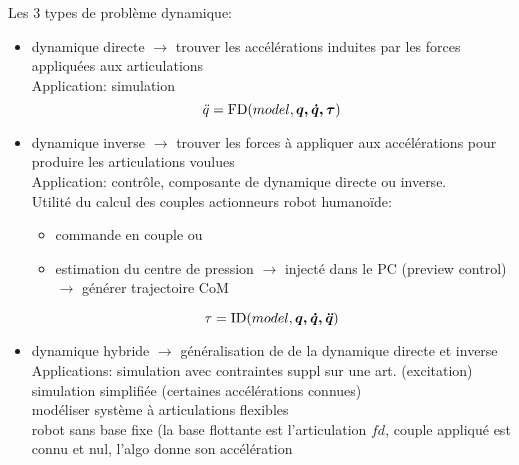 \documentclass[10pt]{beamer}
\begin{document}
\begin{frame}[allowframebreaks]
	Les 3 types de problème dynamique:
  \begin{itemize}
  	\item dynamique directe $\longrightarrow$ trouver les accélérations induites par les forces appliquées aux articulations \\
	      Application: simulation \\
				\begin{equation}
				\ddot{q} = \mathrm{FD}(model,\boldsymbol{q,\dot{q},\tau})
				\end{equation}
  \item dynamique inverse $\longrightarrow$ trouver les forces à appliquer aux accélérations pour produire les articulations voulues \\
	      Application:  contrôle, composante de dynamique directe ou inverse. \\
	      Utilité du calcul des couples actionneurs robot humanoïde: \\
        \begin{itemize}
        \item commande en couple ou
        \item estimation du centre de pression $\longrightarrow$ injecté dans le PC (preview control) $\longrightarrow$ générer trajectoire CoM
        \end{itemize}
				\begin{equation}
				\mathbf{\tau} = \mathrm{ID}(model,\boldsymbol{q,\dot{q},\ddot{q}})
				\end{equation}
  \item dynamique hybride $\longrightarrow$ généralisation de de la dynamique directe et inverse \\
        Applications: simulation avec contraintes suppl sur une art. (excitation) \\
                    simulation simplifiée (certaines accélérations connues) \\
                    modéliser système à articulations flexibles \\
                    robot sans base fixe (la base flottante est l'articulation $fd$, couple appliqué est connu et nul, l'algo donne son accélération
  	\end{itemize}
    

\end{frame}
\end{document}
